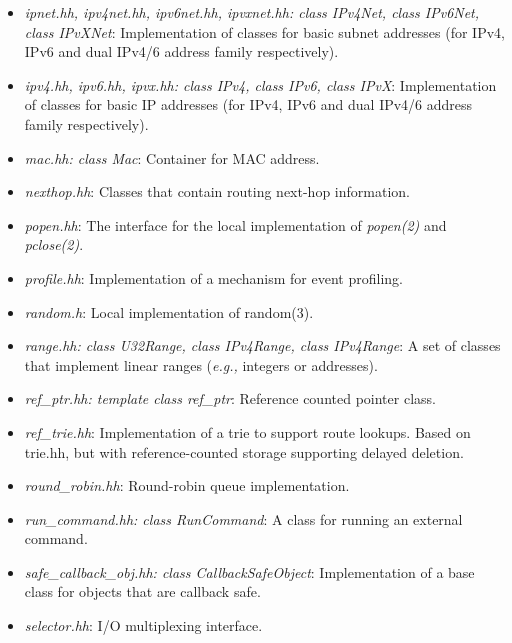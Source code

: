 \documentclass[11pt]{article}
\newcommand{\eg}{\emph{e.g.,}\xspace}
\begin{document}
\begin{itemize}
  \item \emph{ipnet.hh, ipv4net.hh, ipv6net.hh, ipvxnet.hh: class
  IPv4Net, class IPv6Net, class IPvXNet}: Implementation of classes for
  basic subnet addresses (for IPv4, IPv6 and dual IPv4/6 address family
  respectively).

  \item \emph{ipv4.hh, ipv6.hh, ipvx.hh: class
  IPv4, class IPv6, class IPvX}: Implementation of classes for
  basic IP addresses (for IPv4, IPv6 and dual IPv4/6 address family
  respectively).

  \item \emph{mac.hh: class Mac}: Container for MAC address.

  \item \emph{nexthop.hh}: Classes that contain routing next-hop
  information.

  \item \emph{popen.hh}: The interface for the local implementation
  of \emph{popen(2)} and \emph{pclose(2)}.

  \item \emph{profile.hh}: Implementation of a mechanism for event
  profiling.

  \item \emph{random.h}: Local implementation of random(3).

  \item \emph{range.hh: class U32Range, class IPv4Range, class
  IPv4Range}: A set of classes that implement linear ranges (\eg
  integers or addresses).

  \item \emph{ref\_ptr.hh: template class ref\_ptr}: Reference counted
  pointer class.

  \item \emph{ref\_trie.hh}: Implementation of a trie to support route
  lookups.  Based on trie.hh, but with reference-counted storage
  supporting delayed deletion.

  \item \emph{round\_robin.hh}: Round-robin queue implementation.

  \item \emph{run\_command.hh: class RunCommand}: A class for running an
  external command.

  \item \emph{safe\_callback\_obj.hh: class CallbackSafeObject}:
  Implementation of a base class for objects that are callback safe.

  \item \emph{selector.hh}: I/O multiplexing interface.


\end{itemize}
\end{document}

